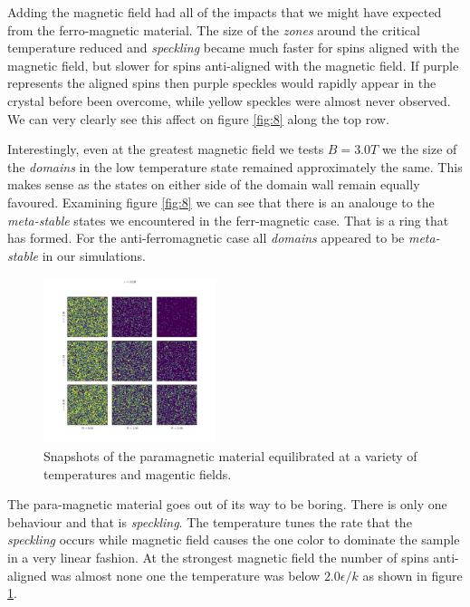 \documentclass[a4paper, twocolumn]{article}
\begin{document}
Adding the magnetic field had all of the impacts that we might have %
expected from the ferro-magnetic material. The size of the \emph{zones} %
around the critical temperature reduced and \emph{speckling} became %
much faster for spins aligned with the magnetic field, but slower for %
spins anti-aligned with the magnetic field. If purple represents the %
aligned spins then purple speckles would rapidly appear in the crystal %
before been overcome, while yellow speckles were almost never observed. %
We can very clearly see this affect on figure \ref{fig:8} along the top %
row. 


Interestingly, even at the greatest magnetic field we tests \(B = 3.0T\) %
we the size of the \emph{domains} in the low temperature state remained %
approximately the same. This makes sense as the states on either side %
of the domain wall remain equally favoured. Examining figure \ref{fig:8} %
we can see that there is an analouge to the \emph{meta-stable} states %
we encountered in the ferr-magnetic case. That is a ring that has formed. %
For the anti-ferromagnetic case all \emph{domains} appeared to be %
\emph{meta-stable} in our simulations. 


\begin{figure}[h]
    \centering
    \includegraphics[width=0.45\textwidth]{pub/figures/external_field_epsilon_zero.pdf}
    \caption{Snapshots of the paramagnetic material equilibrated at %
        a variety of temperatures and magentic fields.}
    \label{fig:9}
\end{figure}


The para-magnetic material goes out of its way to be boring. There is only %
one behaviour and that is \emph{speckling}. The temperature tunes the %
rate that the \emph{speckling} occurs while magnetic field causes the %
one color to dominate the sample in a very linear fashion. At the strongest %
magnetic field the number of spins anti-aligned was almost none one %
the temperature was below \(2.0 \epsilon / k\) as shown in figure \ref{fig:9}.
\end{document}
